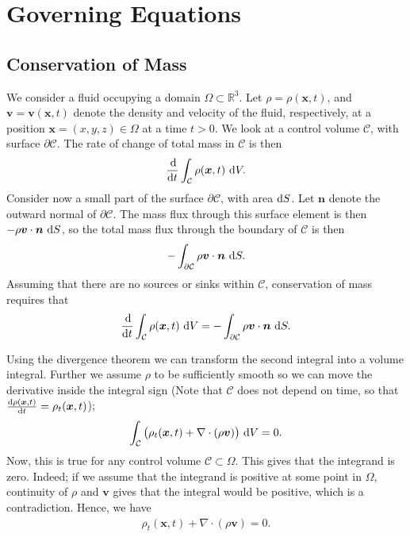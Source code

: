 \documentclass[11pt]{article}
\begin{document}
\section{Governing Equations}

\subsection{Conservation of Mass}

We consider a fluid occupying a domain $\Omega \subset \mathbb{R}^3$. Let $\rho = \rho(\bm{x}, t)$, and
$\bm{v} = \bm{v}(\bm{x},t)$ denote the density and velocity of the fluid, respectively, at a position
$\bm{x} = (x,y,z) \in \Omega$ at a time $t > 0$. We look at a control volume $\mathcal{C}$, with surface $\partial \mathcal{C}$.
The rate of change of total mass in $\mathcal{C}$ is then
\begin{align*}
    \frac{\operatorname{d}\!}{\operatorname{d}\! t}\int_\mathcal{C} \rho(\bm{x},t) \, \operatorname{d}\! V.
\end{align*}
Consider now a small part of the surface $\partial \mathcal{C}$, with area $\operatorname{d}\! S$. Let $\bm{n}$ denote the outward normal
of $\partial \mathcal{C}$. The mass flux through this surface element is then $-\rho \bm{v} \cdot \bm{n} \, \operatorname{d}\! S$, so the
total mass flux through the boundary of $\mathcal{C}$ is then
\begin{align*}
    -\int_{\partial \mathcal{C}}\rho \bm{v} \cdot \bm{n} \, \operatorname{d}\! S.
\end{align*}
Assuming that there are no sources or sinks within $\mathcal{C}$, conservation of mass requires that
\begin{align*}
    \frac{\operatorname{d}\!}{\operatorname{d}\! t}\int_\mathcal{C} \rho(\bm{x},t) \, \operatorname{d}\! V
                            = -\int_{\partial \mathcal{C}}\rho \bm{v} \cdot \bm{n} \, \operatorname{d}\! S.
\end{align*}

Using the divergence theorem we can transform the second integral into
a volume integral. Further we assume $\rho$ to be sufficiently smooth
so we can move the derivative inside the integral sign (Note that
$\mathcal{C}$ does not depend on time, so that $\frac{\operatorname{d}\! \rho(\bm x,t)}{\operatorname{d}\!
  t}= \rho_t(\bm x, t)$);
\begin{align*}
    \int_\mathcal{C} \big(\rho_t(\bm{x},t) + \nabla \cdot (\rho \bm{v}) \big) \, \operatorname{d}\! V = 0.
\end{align*}
Now, this is true for any control volume $\mathcal{C} \subset \Omega$. This gives that the integrand is zero. Indeed;
if we assume that the integrand is positive at some point in $\Omega$, continuity of $\rho$ and $\bm{v}$
gives that the integral would be positive, which is a contradiction. Hence, we have
\begin{align}
    \label{eq:massConservation}
    \rho_t(\bm{x},t) + \nabla \cdot (\rho \bm{v}) = 0.
\end{align}
%
%
\end{document}
